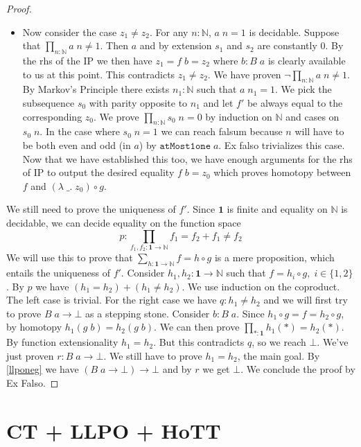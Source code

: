 \documentclass[12pt]{report}
\begin{document}
\begin{proof}
\begin{itemize}
\item Now consider the case $z_1 \neq z_2$. 
For any $n : \mathbb{N}$, $a\; n = 1$ is decidable. 
Suppose that $\prod_{n : 
\mathbb{N}} a\; n \neq 1$. 
Then $a$ and by extension $s_1$ and $s_2$ are constantly $0$. 
By the rhs of the IP we then have $z_1 = f\; b = z_2$ where $b : B\; a$ is clearly available to us at this point. 
This contradicts $z_1 \neq z_2$. 
We have proven $\neg \prod_{n : 
\mathbb{N}} a\; n \neq 1$. 
By Markov's Principle there exists $n_1 : \mathbb{N}$ such that $a\; n_1 = 1$. 
We pick the subsequence $s_0$ with parity opposite to $n_1$ and let $f'$ be always equal to the corresponding $z_0$. 
We prove $\prod_{n : \mathbb{N}} s_0\; n = 0$ by induction on $\mathbb{N}$ and cases on $s_0 \;n$. 
In the case where $s_0\; n = 1$ we can reach falsum because $n$ will have to be both even and odd (in $a$) by $\mathtt{atMost1one} \; a$. Ex falso trivializes this case. 
Now that we have established this too, we have enough arguments for the rhs of IP to output the desired equality $f\; b = z_0$ which proves homotopy between $f$ and $(\lambda\;\_.\; z_0) \circ g$.
\end{itemize}
We still need to prove the uniqueness of $f'$. 
Since $\mathbf{1}$ is finite and equality on $\mathbb{N}$ is decidable, we can decide equality on the function space 
$$p : \prod_{f_1,f_2 : \mathbf{1}\rightarrow \mathbb{N}} f_1 = f_2 + f_1 \neq f_2$$
We will use this to prove that $\sum_{h : \mathbf{1}\rightarrow \mathbb{N}} f= h \circ g$ is a mere proposition, which entails the uniqueness of $f'$. 
Consider $h_1,h_2 : \mathbf{1}\rightarrow \mathbb{N}$ such that $f= h_i \circ g,\; i \in \{1,2\}$. 
By $p$ we have $(h_1 = h_2) + (h_1 \neq h_2)$. 
We use induction on the coproduct. 
The left case is trivial. 
For the right case we have $q : h_1 \neq h_2$ and we will first try to prove $B\; a \rightarrow \bot$ as a stepping stone. 
Consider $b : B\; a$. 
Since $h_1 \circ g = f = h_2 \circ g$, by homotopy $h_1 (g\; b) = h_2 (g\; b)$. 
We can then prove $\prod_{*: \mathbf{1}} h_1 (*) = h_2 (*)$. 
By function extensionality $h_1 = h_2$. 
But this contradicts $q$, so we reach $\bot$. 
We've just proven $r : B\;a \rightarrow \bot$. 
We still have to prove $h_1 = h_2$, the main goal. 
By \cref{llponeg} we have $(B\; a \rightarrow \bot) \rightarrow \bot$ and by $r$ we get $\bot$. 
We conclude the proof by Ex Falso.
\end{proof}

\section{CT + LLPO + HoTT}
\end{document}
